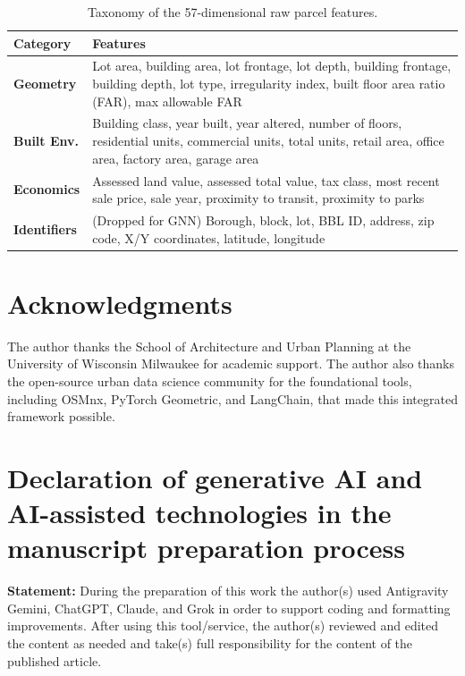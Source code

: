 \documentclass[final,3p,times]{elsarticle}
\begin{document}
\begin{table}[htbp]
\centering
\caption{Taxonomy of the 57-dimensional raw parcel features.}
\label{tab:features}
\begin{tabular}{lp{11cm}}
\toprule
\textbf{Category} & \textbf{Features} \\
\midrule
\textbf{Geometry} & Lot area, building area, lot frontage, lot depth, building frontage, building depth, lot type, irregularity index, built floor area ratio (FAR), max allowable FAR \\
\textbf{Built Env.} & Building class, year built, year altered, number of floors, residential units, commercial units, total units, retail area, office area, factory area, garage area \\
\textbf{Economics} & Assessed land value, assessed total value, tax class, most recent sale price, sale year, proximity to transit, proximity to parks \\
\textbf{Identifiers} & (Dropped for GNN) Borough, block, lot, BBL ID, address, zip code, X/Y coordinates, latitude, longitude \\
\bottomrule
\end{tabular}
\end{table}


\section*{Acknowledgments}
The author thanks the School of Architecture and Urban Planning at the University of Wisconsin Milwaukee for academic support. The author also thanks the open-source urban data science community for the foundational tools, including OSMnx, PyTorch Geometric, and LangChain, that made this integrated framework possible.

\section*{Declaration of generative AI and AI-assisted technologies in the manuscript preparation process}
\textbf{Statement:} During the preparation of this work the author(s) used Antigravity Gemini, ChatGPT, Claude, and Grok in order to support coding and formatting improvements. After using this tool/service, the author(s) reviewed and edited the content as needed and take(s) full responsibility for the content of the published article.
\end{document}
